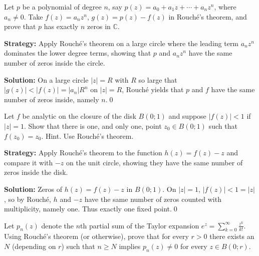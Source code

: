 \begin{problembox}
\begin{problemstatement}
Let \( p \) be a polynomial of degree \( n \), say \( p(z) = a_0 + a_1 z + \cdots + a_n z^n \), where \( a_n \neq 0 \). Take \( f(z) = a_n z^n \), \( g(z) = p(z) - f(z) \) in Rouché's theorem, and prove that \( p \) has exactly \( n \) zeros in \( \mathbb{C} \).
\end{problemstatement}
\end{problembox}

\noindent\textbf{Strategy:} Apply Rouché's theorem on a large circle where the leading term \( a_n z^n \) dominates the lower degree terms, showing that \( p \) and \( a_n z^n \) have the same number of zeros inside the circle.

\bigskip\noindent\textbf{Solution:}
On a large circle $|z|=R$ with $R$ so large that $|g(z)|<|f(z)|=|a_n|R^n$ on $|z|=R$, Rouché yields that $p$ and $f$ have the same number of zeros inside, namely $n$.\qed


\begin{problembox}
\begin{problemstatement}
Let \( f \) be analytic on the closure of the disk \( B(0; 1) \) and suppose \( |f(z)| < 1 \) if \( |z| = 1 \). Show that there is one, and only one, point \( z_0 \in B(0; 1) \) such that \( f(z_0) = z_0 \). Hint. Use Rouché's theorem.
\end{problemstatement}
\end{problembox}

\noindent\textbf{Strategy:} Apply Rouché's theorem to the function \( h(z) = f(z) - z \) and compare it with \( -z \) on the unit circle, showing they have the same number of zeros inside the disk.

\bigskip\noindent\textbf{Solution:}
Zeros of $h(z)=f(z)-z$ in $B(0;1)$. On $|z|=1$, $|f(z)|<1=|z|$, so by Rouché, $h$ and $-z$ have the same number of zeros counted with multiplicity, namely one. Thus exactly one fixed point.\qed


\begin{problembox}
\begin{problemstatement}
Let \( p_n(z) \) denote the \( n \)th partial sum of the Taylor expansion \( e^z = \sum_{k=0}^{\infty} \frac{z^k}{k!} \). Using Rouché's theorem (or otherwise), prove that for every \( r > 0 \) there exists an \( N \) (depending on \( r \)) such that \( n \geq N \) implies \( p_n(z) \neq 0 \) for every \( z \in B(0; r) \).
\end{problemstatement}
\end{problembox}

